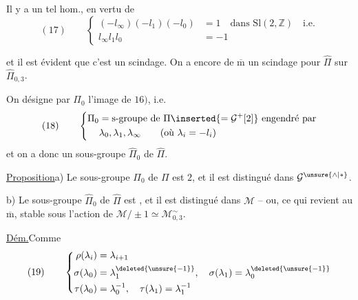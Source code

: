 Il  y a un tel hom., en vertu de
\[
(17)\qquad
\left\{\begin{aligned}
(-l_\infty)(-l_1)(-l_0)&=1\quad\text{dans }\mathrm{Sl}(2,\mathbb Z)\quad\text{i.e.}\\
l_\infty l_1l_0&=-1
\end{aligned}\right.
\]
\margin{$)$}

et il est évident que c'est un scindage. On a encore de $\overline{\mathrm m}$ un scindage pour $\widehat\Pi$ sur $\widehat\Pi_{0,3}$.

On désigne par $\Pi_0$ l'image de $16)$, i.e.
\[
(18)\qquad
\left\{\begin{aligned}
\Pi_0&=\text{s-groupe de }\Pi\inserted{=\mathcal{G}^{+}[2]}\text{ engendré par}\\
&\lambda_0,\lambda_1,\lambda_\infty\qquad(\text{où }\lambda_i=-l_i)
\end{aligned}\right.
\]
et on a donc un sous-groupe $\widehat\Pi_0$ de $\widehat\Pi$.

\uline{Proposition}\quad a) Le sous-groupe $\Pi_0$ de $\Pi$ est  $2$, et il est distingué dans $\mathcal{G}^{\unsure{\wedge|*}}$.

b) Le sous-groupe $\widehat\Pi_0$ de $\widehat\Pi$ est , et il est distingué dans $\mathcal M$ -- ou, ce qui revient au $\overline{\mathrm m}$, stable sous l'action de $\mathcal M/\pm1\simeq\mathcal M_{0,3}^{\sim}$.

\uline{Dém.}\quad Comme
\[
(19)\qquad
\left\{\begin{aligned}
\rho(\lambda_i)&=\lambda_{i+1}\\
\sigma(\lambda_0)&=\lambda_{1}^{\deleted{\unsure{-1}}},\quad
\sigma(\lambda_1)=\lambda_0^{\deleted{\unsure{-1}}}\\
\tau(\lambda_0)&=\lambda_0^{-1},\quad\tau(\lambda_1)=\lambda_1^{-1}
\end{aligned}\right.
\]

